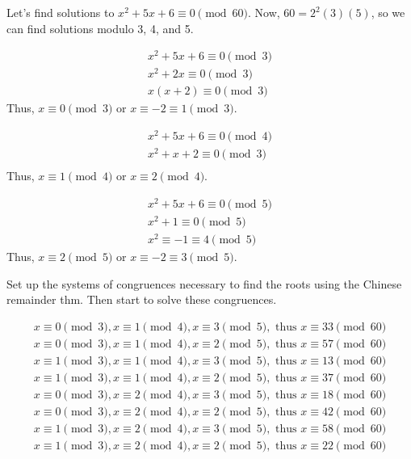 \documentclass[letterpaper, 11 pt]{article}
\begin{document}
\begin{example} Let's find solutions to
$x^2+5x+6\equiv0 \pmod{60}$. Now, $60=2^2(3)(5)$, so we can find solutions modulo 3, 4, and 5.

\begin{align*}
 x^2+5x+6 \equiv0 \pmod{3}\\
 x^2+2x\equiv0 \pmod{3}\\
 x(x+2)\equiv0 \pmod{3}
\end{align*}
Thus, $x\equiv 0 \pmod 3$ or $x\equiv -2\equiv 1 \pmod 3$.

\begin{align*}
 x^2+5x+6 \equiv0 \pmod{4}\\
 x^2+x+2\equiv0 \pmod{3}\\
\end{align*}
Thus, $x\equiv 1 \pmod 4$ or $x\equiv 2 \pmod 4$.

\begin{align*}
 x^2+5x+6 \equiv0 \pmod{5}\\
 x^2+1\equiv0 \pmod{5}\\
 x^2\equiv-1\equiv 4 \pmod{5}
\end{align*}
Thus, $x \equiv 2\pmod 5$ or $x\equiv -2\equiv 3 \pmod 5$.
\end{example}

\begin{br}[10 min]
 Set up the systems of congruences necessary to find the roots using the Chinese remainder thm. Then start to solve these congruences.
\end{br}
\begin{solution}
\begin{align*}
x\equiv 0 \pmod 3, x\equiv 1 \pmod 4, x\equiv 3 \pmod 5, \textrm{ thus $x\equiv 33 \pmod{60}$}\\
x\equiv 0 \pmod 3, x\equiv 1 \pmod 4, x\equiv 2 \pmod 5, \textrm{ thus $x\equiv 57 \pmod{60}$}\\
x\equiv 1 \pmod 3, x\equiv 1 \pmod 4, x\equiv 3 \pmod 5, \textrm{ thus $x\equiv 13 \pmod{60}$}\\
x\equiv 1 \pmod 3, x\equiv 1 \pmod 4, x\equiv 2 \pmod 5, \textrm{ thus $x\equiv 37 \pmod{60}$}\\
x\equiv 0 \pmod 3, x\equiv 2 \pmod 4, x\equiv 3 \pmod 5, \textrm{ thus $x\equiv 18 \pmod{60}$}\\
x\equiv 0 \pmod 3, x\equiv 2 \pmod 4, x\equiv 2 \pmod 5, \textrm{ thus $x\equiv 42 \pmod{60}$}\\
x\equiv 1 \pmod 3, x\equiv 2 \pmod 4, x\equiv 3 \pmod 5, \textrm{ thus $x\equiv 58 \pmod{60}$}\\
x\equiv 1 \pmod 3, x\equiv 2 \pmod 4, x\equiv 2 \pmod 5, \textrm{ thus $x\equiv 22 \pmod{60}$}\\
\end{align*}
\end{solution}
\end{document}
